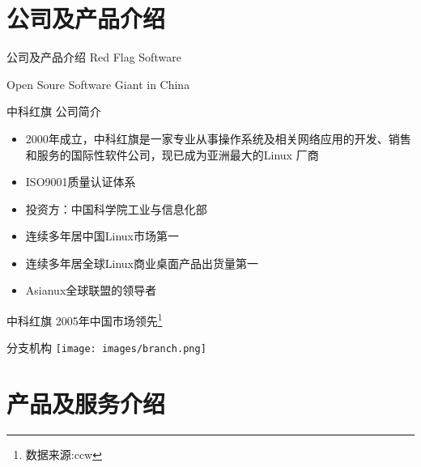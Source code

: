 \section{公司及产品介绍}
\begin{frame}{公司及产品介绍}
{Red Flag Software}

{Open Soure Software Giant in China}

\end{frame}

\begin{frame}{中科红旗 公司简介}
\begin{itemize}
\item 2000年成立，中科红旗是一家专业从事操作系统及相关网络应用的开发、销售和服务的国际性软件公司，现已成为亚洲最大的Linux 厂商
 \item ISO9001质量认证体系 
\item 投资方：中国科学院工业与信息化部
\item 连续多年居中国Linux市场第一
\item 连续多年居全球Linux商业桌面产品出货量第一
\item  Asianux全球联盟的领导者
\end{itemize}
\end{frame}

\begin{frame}{中科红旗 2005年中国市场领先\footnote{数据来源:ccw}}
\end{frame}


\begin{frame}{分支机构}
\center \texttt{[image: images/branch.png]}
\end{frame}
\section{产品及服务介绍}